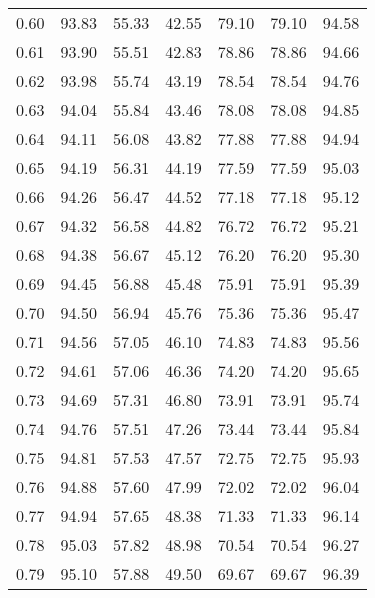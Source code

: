 \begin{tabular}{|c|c|c|c|c|c|c|}
      0.60 &     93.83 &     55.33 &      42.55 &   79.10 &      79.10 &         94.58 \\
      0.61 &     93.90 &     55.51 &      42.83 &   78.86 &      78.86 &         94.66 \\
      0.62 &     93.98 &     55.74 &      43.19 &   78.54 &      78.54 &         94.76 \\
      0.63 &     94.04 &     55.84 &      43.46 &   78.08 &      78.08 &         94.85 \\
      0.64 &     94.11 &     56.08 &      43.82 &   77.88 &      77.88 &         94.94 \\
      0.65 &     94.19 &     56.31 &      44.19 &   77.59 &      77.59 &         95.03 \\
      0.66 &     94.26 &     56.47 &      44.52 &   77.18 &      77.18 &         95.12 \\
      0.67 &     94.32 &     56.58 &      44.82 &   76.72 &      76.72 &         95.21 \\
      0.68 &     94.38 &     56.67 &      45.12 &   76.20 &      76.20 &         95.30 \\
      0.69 &     94.45 &     56.88 &      45.48 &   75.91 &      75.91 &         95.39 \\
      0.70 &     94.50 &     56.94 &      45.76 &   75.36 &      75.36 &         95.47 \\
      0.71 &     94.56 &     57.05 &      46.10 &   74.83 &      74.83 &         95.56 \\
      0.72 &     94.61 &     57.06 &      46.36 &   74.20 &      74.20 &         95.65 \\
      0.73 &     94.69 &     57.31 &      46.80 &   73.91 &      73.91 &         95.74 \\
      0.74 &     94.76 &     57.51 &      47.26 &   73.44 &      73.44 &         95.84 \\
      0.75 &     94.81 &     57.53 &      47.57 &   72.75 &      72.75 &         95.93 \\
      0.76 &     94.88 &     57.60 &      47.99 &   72.02 &      72.02 &         96.04 \\
      0.77 &     94.94 &     57.65 &      48.38 &   71.33 &      71.33 &         96.14 \\
      0.78 &     95.03 &     57.82 &      48.98 &   70.54 &      70.54 &         96.27 \\
      0.79 &     95.10 &     57.88 &      49.50 &   69.67 &      69.67 &         96.39 \\

\end{tabular}
